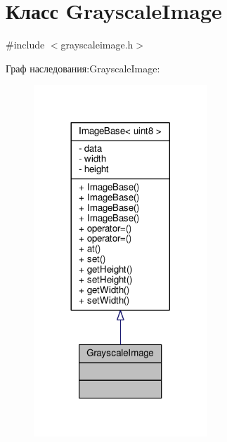\hypertarget{class_grayscale_image}{}\section{Класс Grayscale\+Image}
\label{class_grayscale_image}


{\ttfamily \#include $<$grayscaleimage.\+h$>$}



Граф наследования\+:Grayscale\+Image\+:
\nopagebreak
\begin{figure}[H]
\begin{center}
\leavevmode
\includegraphics[width=185pt]{d2/dd8/class_grayscale_image__inherit__graph}
\end{center}
\end{figure}


